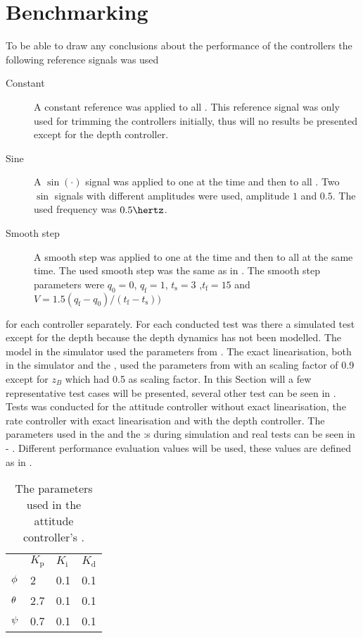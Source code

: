 \section{Benchmarking}
To be able to draw any conclusions about the performance of the controllers the following reference signals was used
\begin{description}
\item[Constant] A constant reference was applied to all \abbrDOF. This reference signal was only used for trimming the controllers initially, thus will no results be presented except for the depth controller.

\item[Sine] A $\sin(\cdot)$ signal was applied to one \abbrDOF at the time and then to all \abbrDOF. Two $\sin$ signals with different amplitudes were used, amplitude $1$ and $0.5$. The used frequency was $0.5 \hertz$.

\item[Smooth step] A smooth step was applied to one \abbrDOF at the time and then to all \abbrDOF at the same time. The used smooth step was the same as in \citet[p. 192-195]{robotics}. The smooth step parameters were $q_{\text{0}} = 0$, $q_{\text{f}} = 1$, $t_{\text{s}} = 3$ ,$t_{\text{f}} = 15$ and $V = 1.5 (q_{\text{f}} - q_{\text{0}})/(t_{\text{f}} - t_{\text{s}}))$
\end{description}
for each controller separately. For each conducted test was there a simulated test except for the depth because the depth dynamics has not been modelled. The \abbrROV model in the simulator used the parameters from . The exact linearisation, both in the simulator and the \abbrROV, used the parameters from  with an scaling factor of 0.9 except for $z_B$ which had 0.5 as scaling factor. In this Section will a few representative test cases will be presented,  several other test can be seen in . Tests was conducted for the \abbrPID attitude controller without exact linearisation, the \abbrPI rate controller with exact linearisation and with the \abbrPI depth controller. The parameters used in the \abbrPID and the \abbrPI:s during simulation and real tests can be seen in  - . Different performance evaluation values will be used, these values are defined as in \citet{reglerteori}. 

\begin{table}[tbp]
  \centering
  \caption{\label{tab:parametersAttitude}%
    The parameters used in the attitude controller's \abbrPID.}
  \begin{tabular}{l l l l}
    \toprule%
       & \textbf{$K_\text{p}$} & \textbf{$K_\text{i}$}& \textbf{$K_\text{d}$}\\
    \otoprule%
    $\phi$  & 2   & 0.1 & 0.1 \\
    $\theta$ & 2.7 & 0.1 & 0.1 \\
    $\psi$   & 0.7 & 0.1 & 0.1 \\
    \bottomrule%
  \end{tabular}
\end{table}

